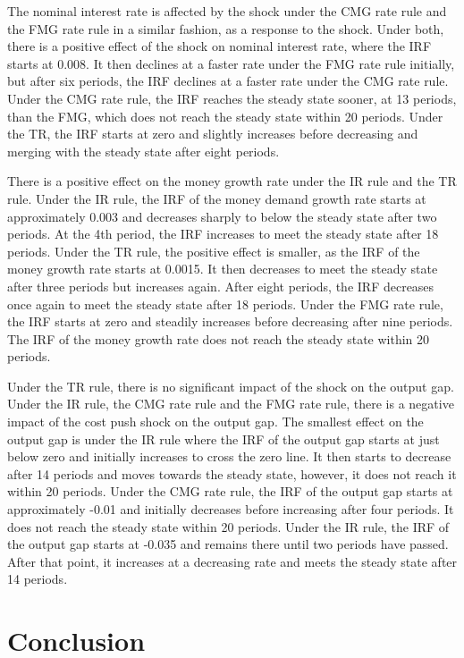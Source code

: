 \documentclass[11pt,preprint, authoryear]{elsarticle}
\numberwithin{equation}{section}
\numberwithin{figure}{section}
\numberwithin{table}{section}
\begin{document}
The nominal interest rate is affected by the shock under the CMG rate
rule and the FMG rate rule in a similar fashion, as a response to the
shock. Under both, there is a positive effect of the shock on nominal
interest rate, where the IRF starts at 0.008. It then declines at a
faster rate under the FMG rate rule initially, but after six periods,
the IRF declines at a faster rate under the CMG rate rule. Under the CMG
rate rule, the IRF reaches the steady state sooner, at 13 periods, than
the FMG, which does not reach the steady state within 20 periods. Under
the TR, the IRF starts at zero and slightly increases before decreasing
and merging with the steady state after eight periods.

There is a positive effect on the money growth rate under the IR rule
and the TR rule. Under the IR rule, the IRF of the money demand growth
rate starts at approximately 0.003 and decreases sharply to below the
steady state after two periods. At the 4th period, the IRF increases to
meet the steady state after 18 periods. Under the TR rule, the positive
effect is smaller, as the IRF of the money growth rate starts at 0.0015.
It then decreases to meet the steady state after three periods but
increases again. After eight periods, the IRF decreases once again to
meet the steady state after 18 periods. Under the FMG rate rule, the IRF
starts at zero and steadily increases before decreasing after nine
periods. The IRF of the money growth rate does not reach the steady
state within 20 periods.

Under the TR rule, there is no significant impact of the shock on the
output gap. Under the IR rule, the CMG rate rule and the FMG rate rule,
there is a negative impact of the cost push shock on the output gap. The
smallest effect on the output gap is under the IR rule where the IRF of
the output gap starts at just below zero and initially increases to
cross the zero line. It then starts to decrease after 14 periods and
moves towards the steady state, however, it does not reach it within 20
periods. Under the CMG rate rule, the IRF of the output gap starts at
approximately -0.01 and initially decreases before increasing after four
periods. It does not reach the steady state within 20 periods. Under the
IR rule, the IRF of the output gap starts at -0.035 and remains there
until two periods have passed. After that point, it increases at a
decreasing rate and meets the steady state after 14 periods.

\newpage

\hypertarget{conclusion}{%
\section{Conclusion}\label{conclusion}}


\end{document}
